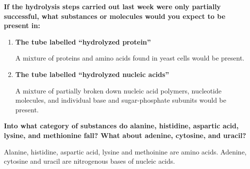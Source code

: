 \noindent
\textbf{If the hydrolysis steps carried out last week were only partially successful, what substances or molecules would you expect to be present in:}
    \begin{enumerate}[label = (\alph*)]
        \item \textbf{The tube labelled ``hydrolyzed protein''}\par A mixture of proteins and amino acids found in yeast cells would be present.
        \item \textbf{The tube labelled ``hydrolyzed nucleic acids''}\par A mixture of partially broken down nucleic acid polymers, nucleotide molecules, and individual base and sugar-phosphate subunits would be present.
    \end{enumerate}
\noindent
\textbf{Into what category of substances do alanine, histidine, aspartic acid, lysine, and methionine fall? What about adenine, cytosine, and uracil?}\par
\indent
Alanine, histidine, aspartic acid, lysine and methoinine are amino acids. Adenine, cytosine and uracil are nitrogenous bases of nucleic acids.

